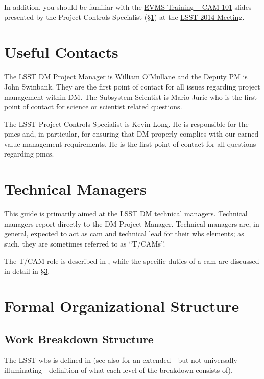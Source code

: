 In addition, you should be familiar with the \href{https://project.lsst.org/meetings/lsst2014/node/100}{EVMS Training -- CAM 101} slides presented by the Project Controls Specialist (\S\ref{sec:contacts}) at the \href{https://project.lsst.org/meetings/lsst2014/}{LSST 2014 Meeting}.

\section{Useful Contacts}
\label{sec:contacts}

The LSST DM Project Manager is William O'Mullane and the Deputy PM is John Swinbank.
They are the first point of contact for all issues regarding project management within DM.
The Subsystem Scientist is Mario Juric who is the first point of contact for science or scientist related questions.

The LSST Project Controls Specialist is Kevin Long.
He is responsible for the \gls{pmcs} and, in particular, for ensuring that DM properly complies with our earned value management requirements.
He is the first point of contact for all questions regarding \gls{pmcs}.

\section{Technical Managers}
\label{sec:tcam}

This guide is primarily aimed at the LSST DM technical managers.
Technical managers report directly to the DM Project Manager.
Technical managers are, in general, expected to act as \gls{cam} and technical lead for their \gls{wbs} \glspl{element}; as such, they are sometimes referred to as ``T/CAMs''.

The T/CAM role is described in , while the specific duties of a \gls{cam} are discussed in detail in \S\ref{sec:structure}.

\section{Formal Organizational Structure}
\label{sec:structure}

\subsection{Work Breakdown Structure}
\label{sec:wbs}

The LSST \gls{wbs} is defined in  (see also  for an extended---but not universally illuminating---definition of what each level of the breakdown consists of).

